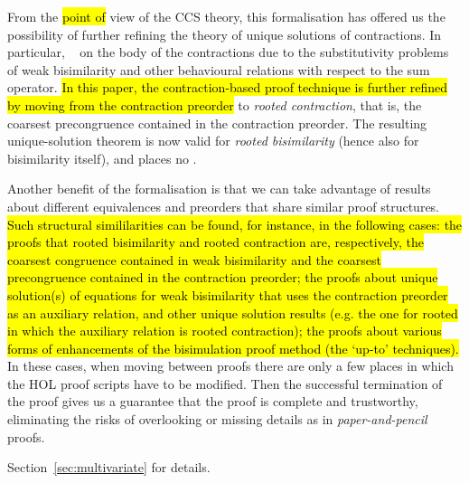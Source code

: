 From the \hl{point of} view of the CCS theory, this formalisation has offered us the possibility of
further refining the theory of unique solutions of contractions.
In particular, ~\cite{sangiorgi2017equations}  on the body of the contractions due to the
substitutivity problems of weak bisimilarity and other behavioural relations with respect
to the sum operator.
\hl{In this paper, the contraction-based proof technique is further
refined by moving from the contraction preorder} to
\emph{rooted contraction}, that is, the coarsest precongruence contained in the contraction
preorder. The resulting unique-solution theorem is now valid for
\emph{rooted bisimilarity} (hence also for bisimilarity itself), and places no 
.

Another benefit of the formalisation is 
that we can take advantage of results about different 
equivalences and preorders that share similar proof structures.
\hl{Such structural simililarities can be found, for instance, in the
following cases: the proofs that rooted bisimilarity and rooted
contraction are, respectively, the coarsest congruence contained in
weak bisimilarity and the coarsest precongruence contained in the
contraction preorder; the proofs about unique solution(s) of equations
for weak bisimilarity that uses the contraction preorder as an
auxiliary relation, and other unique solution results (e.g. the one
for rooted in which the auxiliary relation is rooted contraction); the
proofs about various forms of enhancements of the bisimulation proof
method (the `up-to' techniques).}
%
In these cases, when moving between proofs there are only a few places in
which the HOL proof scripts have to be modified.
Then the successful termination of the proof gives us a guarantee that the proof is
complete and trustworthy, eliminating the risks 
of overlooking or missing details as in \emph{paper-and-pencil} proofs.





 Section~\ref{sec:multivariate} for  details.

